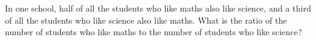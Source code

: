 In one school, half of all the students who like maths also like science, and a third of all the students who like science also like maths. What is the ratio of the number of students who like maths to the number of students who like science?
